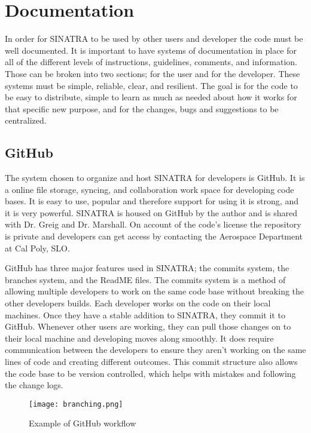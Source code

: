 \section{Documentation}
In order for SINATRA to be used by other users and developer the code must be well documented. It is important to have systems of documentation in place for all of the different levels of instructions, guidelines, comments, and information. Those can be broken into two sections; for the user and for the developer. These systems must be simple, reliable, clear, and resilient. The goal is for the code to be easy to distribute, simple to learn as much as needed about how it works for that specific new purpose, and for the changes, bugs and suggestions to be centralized.
\subsection{GitHub}
The system chosen to organize and host SINATRA for developers is GitHub. It is a online file storage, syncing, and collaboration work space for developing code bases. It is easy to use, popular and therefore support for using it is strong, and it is very powerful. SINATRA is housed on GitHub by the author and is shared with Dr. Greig and Dr. Marshall. On account of the code's license the repository is private and developers can get access by contacting the Aerospace Department at Cal Poly, SLO. \par
\indent GitHub has three major features used in SINATRA; the commits system, the branches system, and the ReadME files. The commits system is a method of allowing multiple developers to work on the same code base without breaking the other developers builds. Each developer works on the code on their local machines. Once they have a stable addition to SINATRA, they commit it to GitHub. Whenever other users are working, they can pull those changes on to their local machine and developing moves along smoothly. It does require communication between the developers to ensure they aren't working on the same lines of code and creating different outcomes. This commit structure also allows the code base to be version controlled, which helps with mistakes and following the change logs. \par


\begin{figure}
\texttt{[image: branching.png]}
\centering
\caption{Example of GitHub workflow}
\label{fig:github}
\end{figure}


